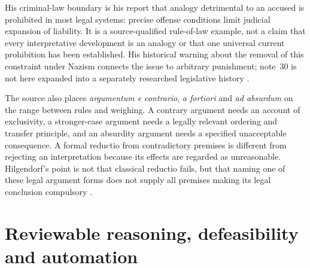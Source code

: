 His criminal-law boundary is his report that analogy detrimental to an accused
is prohibited in most legal systems: precise offense conditions
limit judicial expansion of liability. It is a source-qualified
rule-of-law example, not a claim that every interpretative development is
an analogy or that one universal current prohibition has been established.
His historical warning about the removal of this constraint under Nazism
connects the issue to arbitrary punishment; note~30 is not here expanded
into a separately researched legislative history
\parencite[p.~664, note~30 on p.~666]{Hilgendorf2021LegalLogic}.

The source also places \emph{argumentum e contrario}, \emph{a fortiori}
and \emph{ad absurdum} on the range between rules and weighing. A contrary
argument needs an account of exclusivity, a stronger-case argument needs a
legally relevant ordering and transfer principle, and an absurdity argument
needs a specified unacceptable consequence. A formal reductio from
contradictory premises is different from rejecting an interpretation because
its effects are regarded as unreasonable. Hilgendorf's point is not that
classical reductio fails, but that naming one of these legal argument forms
does not supply all premises making its legal conclusion compulsory
\parencite[p.~664, note~27 on p.~665]{Hilgendorf2021LegalLogic}.

\section{Reviewable reasoning, defeasibility and automation}
\label{sec:p11-rat113-reviewability}

